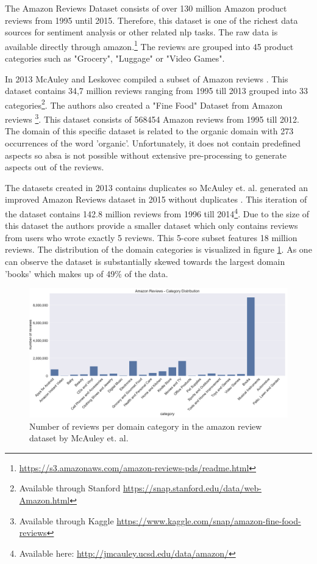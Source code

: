 The Amazon Reviews Dataset consists of over 130 million Amazon product reviews from 1995 until 2015. Therefore, this dataset is one of the richest data sources for sentiment analysis or other related \gls{nlp} tasks. The raw data is available directly through amazon.\footnote{\hyperlink{https://s3.amazonaws.com/amazon-reviews-pds/readme.html}{https://s3.amazonaws.com/amazon-reviews-pds/readme.html}} The reviews are grouped into 45 product categories such as "Grocery", "Luggage" or "Video Games". 

In 2013 McAuley and Leskovec compiled a subset of Amazon reviews \cite{McAuley2013}. This dataset contains 34,7 million reviews ranging from 1995 till 2013 grouped into 33 categories\footnote{Available through Stanford \hyperlink{https://snap.stanford.edu/data/web-Amazon.html}{https://snap.stanford.edu/data/web-Amazon.html}}. The authors also created a "Fine Food" Dataset from Amazon reviews \cite{McAuley2013a} \footnote{Available through Kaggle \hyperlink{https://www.kaggle.com/snap/amazon-fine-food-reviews}{https://www.kaggle.com/snap/amazon-fine-food-reviews}}. This dataset consists of 568454 Amazon reviews from 1995 till 2012. The domain of this specific dataset is related to the organic domain with 273 occurrences of the word 'organic'. Unfortunately, it does not contain predefined aspects so \gls{absa} is not possible without extensive pre-processing to generate aspects out of the reviews.

The datasets created in 2013 contains duplicates so McAuley et. al. generated an improved Amazon Reviews dataset in 2015 without duplicates \cite{McAuley2015}\cite{He2016}. This iteration of the dataset contains 142.8 million reviews from 1996 till 2014\footnote{Available here: \hyperlink{http://jmcauley.ucsd.edu/data/amazon/}{http://jmcauley.ucsd.edu/data/amazon/}}. Due to the size of this dataset the authors provide a smaller dataset which only contains reviews from users who wrote exactly 5 reviews. This 5-core subset features 18 million reviews. The distribution of the domain categories is visualized in figure \ref{fig:05_amazonDatasetDistributin}. As one can observe the dataset is substantially skewed towards the largest domain 'books' which makes up of 49\% of the data.

\begin{figure}[ht]
	\centering
	\includegraphics[width=\textwidth]{figures/05_setup/05_amazonReviewsCategories}
	\caption{Number of reviews per domain category in the amazon review dataset by McAuley et. al. \cite{McAuley2015}}
	\label{fig:05_amazonDatasetDistributin}
\end{figure}

